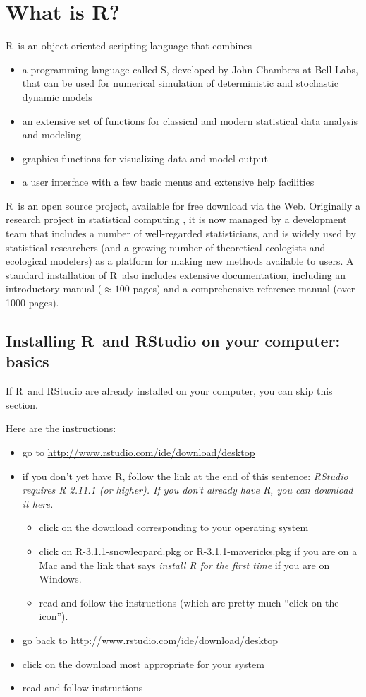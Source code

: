 \documentclass[11pt]{article}\usepackage[]{graphicx}\usepackage[]{color}
\newcommand\R{{\sf R}}
\newcommand\Slang{{\sf S}}
\numberwithin{exercise}{section}
\begin{document}
\section{What is \R?}
\R\ is an object-oriented scripting language that combines 
\begin{itemize}
\item a programming language called \Slang,
developed by John Chambers at Bell Labs, that can be used for 
numerical simulation of deterministic and stochastic dynamic models
\item an extensive set of functions for classical and modern
  statistical data analysis and modeling
\item graphics functions for visualizing data and model output
\item a user interface with a few basic menus and extensive help
facilities
\end{itemize}

\R\ is an open source project, available for free download via the
Web. Originally a research project in statistical computing
\citep{IhakaGentleman1996}, it is now managed by a development team
that includes a number of well-regarded statisticians, and is widely
used by statistical researchers (and a growing number of theoretical
ecologists and ecological modelers) as a platform for making new
methods available to users. A standard installation of \R\ also
includes extensive documentation, including an introductory manual
($\approx 100$ pages) and a comprehensive reference manual (over 1000
pages).

\subsection{Installing \R\ and RStudio on your computer: basics}

If \R\ and RStudio are already installed on your computer, 
you can skip this section.

Here are the instructions:
\begin{itemize}
\item go to \url{http://www.rstudio.com/ide/download/desktop}
\item if you don't yet have \R, follow the link at the end of this
  sentence: \emph{RStudio requires R 2.11.1 (or higher). If you don't already have R, you can download it here.}
\begin{itemize}
  \item click on the download corresponding to your operating system
  \item click on R-3.1.1-snowleopard.pkg or R-3.1.1-mavericks.pkg if
    you are on a Mac and the link that says \emph{install R for the
      first time} if you are on Windows.
\item read and follow
the instructions (which are pretty much ``click on the icon'').
\end{itemize}
\item go back to \url{http://www.rstudio.com/ide/download/desktop}
 \item click on the download most appropriate for your system
 \item read and follow instructions
\end{itemize}
\end{document}
